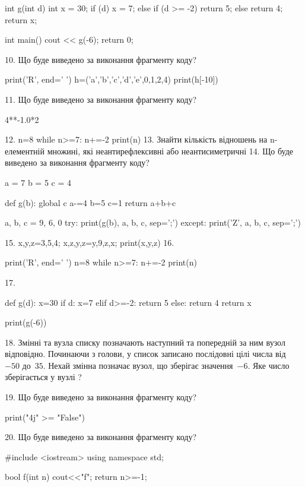 \documentclass[11pt]{article}
\begin{document}
int g(int d){
    int x = 30;
    if (d) 
        x = 7;
    else if (d >= -2)
         return 5;
    else
         return 4;
    return x;
}

int main(){
    cout << g(-6);
    return 0;
}


10. Що буде виведено за виконання фрагменту коду?

print('R', end=' ')
h=('a','b','c','d','e',0,1,2,4)
print(h[-10])


11. Що буде виведено за виконання фрагменту коду?

4**-1.0*2

12. 
n=8
   while n>=7: n+=-2
   print(n)
13. 
Знайти кількість відношень на n-елементній множині, які неантирефлексивні або неантисиметричні
14. Що буде виведено за виконання фрагменту коду?

a = 7
b = 5
c = 4

def g(b):
global c    a-=4
    b=5
    c=1
    return a+b+c

a, b, c = 9, 6, 0
try:
    print(g(b), a, b, c, sep=';')
except:
    print('Z', a, b, c, sep=';')

15. 
x,y,z=3,5,4;  x,z,y,z=y,9,z,x;  print(x,y,z)
16. 

print('R', end=' ')
n=8
while n>=7:
    n+=-2
print(n)


17. 

def g(d):
    x=30
    if d: 
        x=7
    elif d>=-2:
         return 5
    else:
         return 4
    return x

print(g(-6))

18. 
Змінні  та  вузла списку позначають наступний та попередній за ним вузол відповідно. Починаючи з голови, у список записано послідовні цілі числа від~$-50$ до~$35$. Нехай змінна  позначає вузол, що зберігає значення~$-6$.
Яке число зберігається у вузлі  ?

19. Що буде виведено за виконання фрагменту коду?

print("4j" >= "False")

20. Що буде виведено за виконання фрагменту коду?

#include <iostream>
using namespace std;

bool f(int n){
    cout<<"f";
    return n>=-1;
}
\end{document}
